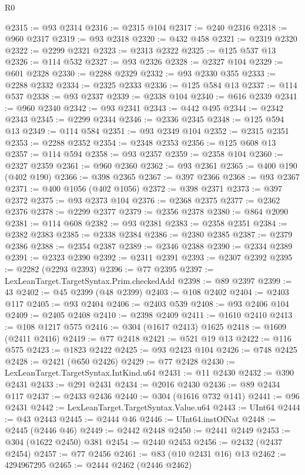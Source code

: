 \begin{lexlean}{R0}
\begin{coremodule}
@2315 := @93 @2314
@2316 := @2315 @104
@2317 := @240 @2316
@2318 := @960 @2317
@2319 := @93 @2318
@2320 := @432 @458
@2321 := @2319 @2320
@2322 := @2299 @2321
@2323 := @2313 @2322
@2325 := @125 @537 @13
@2326 := @114 @532
@2327 := @93 @2326
@2328 := @2327 @104
@2329 := @601 @2328
@2330 := @2288 @2329
@2332 := @93 @2330 @355
@2333 := @2288 @2332
@2334 := @2325 @2333
@2336 := @125 @584 @13
@2337 := @114 @537
@2338 := @93 @2337
@2339 := @2338 @104
@2340 := @616 @2339
@2341 := @960 @2340
@2342 := @93 @2341
@2343 := @442 @495
@2344 := @2342 @2343
@2345 := @2299 @2344
@2346 := @2336 @2345
@2348 := @125 @594 @13
@2349 := @114 @584
@2351 := @93 @2349 @104
@2352 := @2315 @2351
@2353 := @2288 @2352
@2354 := @2348 @2353
@2356 := @125 @608 @13
@2357 := @114 @594
@2358 := @93 @2357
@2359 := @2358 @104
@2360 := @2327 @2359
@2361 := @960 @2360
@2362 := @93 @2361
@2365 := @400 @190 (@402 @190)
@2366 := @398 @2365
@2367 := @397 @2366
@2368 := @93 @2367
@2371 := @400 @1056 (@402 @1056)
@2372 := @398 @2371
@2373 := @397 @2372
@2375 := @93 @2373 @104
@2376 := @2368 @2375
@2377 := @2362 @2376
@2378 := @2299 @2377
@2379 := @2356 @2378
@2380 := @864 @2090
@2381 := @114 @608
@2382 := @93 @2381
@2383 := @2358 @2351
@2384 := @2382 @2383
@2385 := @2338 @2384
@2386 := @2380 @2385
@2387 := @2379 @2386
@2388 := @2354 @2387
@2389 := @2346 @2388
@2390 := @2334 @2389
@2391 := @2323 @2390
@2392 := @2311 @2391
@2393 := @2307 @2392
@2395 := @2282 (@2293 @2393)
@2396 := @77 @2395
@2397 := LexLeanTarget.TargetSyntax.Prim.checkedAdd
@2398 := @89 @2397
@2399 := 43
@2402 := @45 @2399 (@48 @2399)
@2403 := @108 @2402
@2404 := @2403 @117
@2405 := @93 @2404
@2406 := @2403 @539
@2408 := @93 @2406 @104
@2409 := @2405 @2408
@2410 := @2398 @2409
@2411 := @1610 @2410
@2413 := @108 @1217 @575
@2416 := @304 (@1617 @2413) @1625
@2418 := @1609 (@2411 @2416)
@2419 := @77 @2418
@2421 := @521 @19 @13
@2422 := @116 @575
@2423 := @1823 @2422
@2425 := @93 @2423 @104
@2426 := @748 @2425
@2428 := @2421 (@650 @2426)
@2429 := @77 @2428
@2430 := LexLeanTarget.TargetSyntax.IntKind.u64
@2431 := @11 @2430
@2432 := @390 @2431
@2433 := @291 @2431
@2434 := @2016 @2430
@2436 := @89 @2434 @117
@2437 := @2433 @2436
@2440 := @304 (@1616 @732 @141)
@2441 := @96 @2431
@2442 := LexLeanTarget.TargetSyntax.Value.u64
@2443 := UInt64
@2444 := @43 @2443
@2445 := @2444 @46
@2446 := UInt64.instOfNat
@2448 := @2445 (@2446 @46)
@2449 := @2442 @2448
@2450 := @2441 @2449
@2453 := @304 (@1622 @2450) @381
@2454 := @2440 @2453
@2456 := @2432 (@2437 @2454)
@2457 := @77 @2456
@2461 := @83 (@10 @2431 @16) @13
@2462 := 4294967295
@2465 := @2444 @2462 (@2446 @2462)

\end{coremodule}
\end{lexlean}
